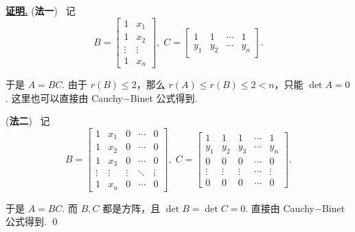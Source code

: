 \documentclass[10pt,openany]{article}
\theoremstyle{thmstyle} %
\theoremstyle{defstyle} %
\theoremstyle{prostyle} %
\theoremstyle{exastyle}
\theoremstyle{remstyle}
\renewenvironment{proof}[1][证明]{\par\underline{\textbf{#1.}} \;\fangsong}{\qed\par}
\begin{document}
\begin{proof}
	(\textbf{法一}) \ 记
	\[ B=\begin{bmatrix}
		1 & x_1 \\
		1 & x_2 \\
		\vdots & \vdots \\
		1 & x_n 
	\end{bmatrix}, \; C=\begin{bmatrix}
	1 & 1 & \cdots & 1 \\
	y_1 & y_2 & \cdots & y_n
	\end{bmatrix}. \]
	
	于是 \( A=BC \). 由于 \( r(B) \leq 2 \)，那么 \( r(A) \leq r(B) \leq 2<n \)，只能 \( \det A=0 \). 这里也可以直接由 Cauchy\(-\)Binet 公式得到.
	
	\vspace{1ex}
	
	(\textbf{法二}) \ 记
	\[ B=\begin{bmatrix}
		1 & x_1 & 0 & \cdots & 0 \\
		1 & x_2 & 0 & \cdots & 0 \\
		1 & x_3 & 0 & \cdots & 0\\
		\vdots & \vdots & \vdots & \ddots & \vdots \\
		1 & x_n & 0 & \cdots & 0
	\end{bmatrix}, \; C=\begin{bmatrix}
		1 & 1 & 1 & \cdots & 1 \\
		y_1 & y_2 & y_3 & \cdots & y_n \\
		0 & 0 & 0 & \cdots & 0 \\
		\vdots & \vdots & \vdots  & \cdots & \vdots \\
		0 & 0 & 0 & \cdots & 0
	\end{bmatrix}. \]
	
	于是 \( A=BC \). 而 \( B,C \) 都是方阵，且 \( \det B=\det C=0 \). 直接由 Cauchy\(-\)Binet 公式得到.
\end{proof}
\end{document}
